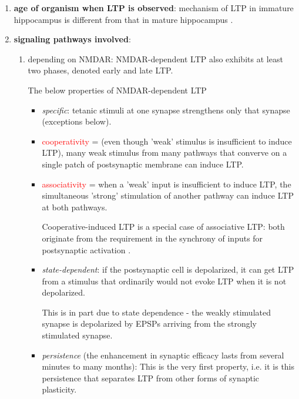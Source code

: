 \begin{enumerate}
  \item {\bf age of organism when LTP is observed}: 
  mechanism of LTP in immature hippocampus is different from that in mature
  hippocampus \citep{yasuda2003}.

  \item {\bf signaling pathways involved}:
  \begin{enumerate}

    \item depending on NMDAR:
    NMDAR-dependent LTP also exhibits at least two phases, denoted early and
    late LTP.
     
The below properties of NMDAR-dependent LTP
\begin{itemize}
  \item {\it specific}: tetanic stimuli at one synapse strengthens only that
  synapse (exceptions below).
  
  \item \textcolor{red}{cooperativity} = (even though 'weak' stimulus is
  insufficient to induce LTP), many weak stimulus from many pathways that
  converve on a single patch of postsynaptic membrane can induce LTP. 

  \item \textcolor{red}{associativity} = when a 'weak' input is insufficient
  to induce LTP, the simultaneous 'strong' stimulation of another pathway can
  induce LTP at both pathways.
  
Cooperative-induced LTP is a special case of associative LTP:  both originate from
the requirement in the synchrony of inputs for postsynaptic activation
\citep{teyler1987}.
  
  \item {\it state-dependent}:  if the postsynaptic cell is depolarized, it can
  get LTP from a stimulus that ordinarily would not evoke LTP when it is not
  depolarized.


This is in part due to state dependence - the weakly stimulated synapse is
depolarized by EPSPs arriving from the strongly stimulated synapse.
 
   \item {\it persistence} (the enhancement in synaptic efficacy lasts from
   several minutes to many months):    This is the very first property, i.e.
   it is this persistence that  separates LTP from other forms of synaptic
   plasticity.
\end{itemize}



\end{enumerate}
\end{enumerate}
